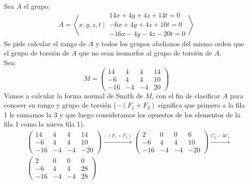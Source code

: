 \begin{ejemplo}
    Sea $A$ el grupo:
    \begin{equation*}
        A = \left\langle x,y,z,t \mid \begin{array}{r}
            14x + 4y + 4z + 14t = 0 \\
            -6x + 4y + 4z + 10t = 0 \\
            -16x- 4y - 4z - 20t = 0
        \end{array}\right\rangle 
    \end{equation*}
    Se pide calcular el rango de $A$ y todos los grupos abelianos del mismo orden que el grupo de torsión de $A$ que no sean isomorfos al grupo de torsión de $A$.\\

    \noindent
    Sea:
    \begin{equation*}
        M = \left(\begin{array}{cccc}
            14 & 4 & 4 & 14 \\
            -6 & 4 & 4 & 10 \\
            -16 & -4 & -4 & 20 
        \end{array}\right)
    \end{equation*}
    Vamos a calcular la forma normal de Smith de $M$, con el fin de clasificar $A$ para conocer su rango y grupo de torsión ($-(F_1+F_3)$ significa que primero a la fila 1 le sumamos la 3 y que luego consideramos los opuestos de los elementos de la fila 1 como la nueva fila 1).
    \begin{align*}
        &\left(\begin{array}{cccc}
            14 & 4 & 4 & 14 \\
            -6 & 4 & 4 & 10 \\
            -16 & -4 & -4 & -20 
        \end{array}\right) 
        \xrightarrow{-(F_1+F_3)}
        \left(\begin{array}{cccc}
            2 & 0 & 0 & 6 \\
            -6 & 4 & 4 & 10 \\
            -16 & -4 & -4 & -20 
        \end{array}\right)  
        \xrightarrow{C_4-3C_1} \\
        &\left(\begin{array}{cccc}
            2 & 0 & 0 & 0 \\
            -6 & 4 & 4 & 28 \\
            -16 & -4 & -4 & 28
        \end{array}\right) 

\end{align*}
\end{ejemplo}
